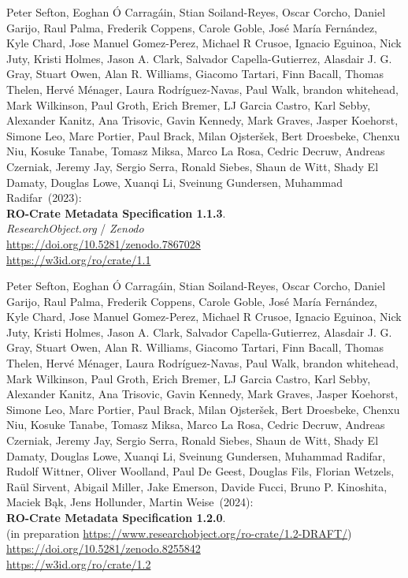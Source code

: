 \begin{thebibliography}{9}
Peter Sefton, Eoghan Ó Carragáin, Stian Soiland-Reyes, Oscar Corcho, Daniel Garijo, Raul Palma, Frederik Coppens, Carole Goble, José María Fernández, Kyle Chard, Jose Manuel Gomez-Perez, Michael R Crusoe, Ignacio Eguinoa, Nick Juty, Kristi Holmes, Jason A. Clark, Salvador Capella-Gutierrez, Alasdair J. G. Gray, Stuart Owen, Alan R. Williams, Giacomo Tartari, Finn Bacall, Thomas Thelen, Hervé Ménager, Laura Rodríguez-Navas, Paul Walk, brandon whitehead, Mark Wilkinson, Paul Groth, Erich Bremer, LJ Garcia Castro, Karl Sebby, Alexander Kanitz, Ana Trisovic, Gavin Kennedy, Mark Graves, Jasper Koehorst, Simone Leo, Marc Portier, Paul Brack, Milan Ojsteršek, Bert Droesbeke, Chenxu Niu, Kosuke Tanabe, Tomasz Miksa, Marco La Rosa, Cedric Decruw, Andreas Czerniak, Jeremy Jay, Sergio Serra, Ronald Siebes, Shaun de Witt, Shady El Damaty, Douglas Lowe, Xuanqi Li, Sveinung Gundersen, Muhammad Radifar~(2023): \\
\textbf{RO-Crate Metadata Specification 1.1.3}.\\
\emph{ResearchObject.org} / \emph{Zenodo}\\
\url{https://doi.org/10.5281/zenodo.7867028}\\
\url{https://w3id.org/ro/crate/1.1}

Peter Sefton, Eoghan Ó Carragáin, Stian Soiland-Reyes, Oscar Corcho, Daniel Garijo, Raul Palma, Frederik Coppens, Carole Goble, José María Fernández, Kyle Chard, Jose Manuel Gomez-Perez, Michael R Crusoe, Ignacio Eguinoa, Nick Juty, Kristi Holmes, Jason A. Clark, Salvador Capella-Gutierrez, Alasdair J. G. Gray, Stuart Owen, Alan R. Williams, Giacomo Tartari, Finn Bacall, Thomas Thelen, Hervé Ménager, Laura Rodríguez-Navas, Paul Walk, brandon whitehead, Mark Wilkinson, Paul Groth, Erich Bremer, LJ Garcia Castro, Karl Sebby, Alexander Kanitz, Ana Trisovic, Gavin Kennedy, Mark Graves, Jasper Koehorst, Simone Leo, Marc Portier, Paul Brack, Milan Ojsteršek, Bert Droesbeke, Chenxu Niu, Kosuke Tanabe, Tomasz Miksa, Marco La Rosa, Cedric Decruw, Andreas Czerniak, Jeremy Jay, Sergio Serra, Ronald Siebes, Shaun de Witt, Shady El Damaty, Douglas Lowe, Xuanqi Li, Sveinung Gundersen, Muhammad Radifar, Rudolf Wittner, Oliver Woolland, Paul De Geest, Douglas Fils, Florian Wetzels, Raül Sirvent, Abigail Miller, Jake Emerson, Davide Fucci, Bruno P. Kinoshita, Maciek Bąk, Jens Hollunder, Martin Weise~(2024): \\
\textbf{RO-Crate Metadata Specification 1.2.0}.\\
(in preparation \url{https://www.researchobject.org/ro-crate/1.2-DRAFT/})\\
\url{https://doi.org/10.5281/zenodo.8255842}\\
\url{https://w3id.org/ro/crate/1.2}


\end{thebibliography}
